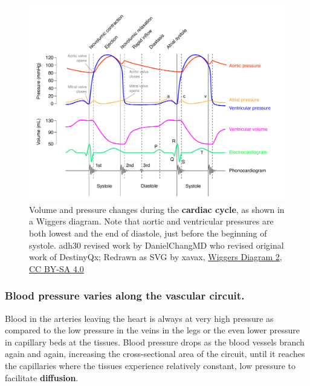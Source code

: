 \documentclass[
  letterpaper,
  DIV=11,
  numbers=noendperiod,
  oneside]{scrartcl}
\begin{document}
\begin{figure}

{\centering \includegraphics{Lab3_files/mediabag/../../images/Wiggers_Diagram_2.pdf}

}

\caption{\label{fig-wiggers}Volume and pressure changes during the
\textbf{cardiac cycle}, as shown in a Wiggers diagram. Note that aortic
and ventricular pressures are both lowest and the end of diastole, just
before the beginning of systole. adh30 revised work by DanielChangMD who
revised original work of DestinyQx; Redrawn as SVG by xavax,
\href{https://commons.wikimedia.org/wiki/File:Wiggers_Diagram_2.svg}{Wiggers
Diagram 2},
\href{https://creativecommons.org/licenses/by-sa/4.0/legalcode}{CC BY-SA
4.0}}

\end{figure}

\hypertarget{blood-pressure-varies-along-the-vascular-circuit.}{%
\subsubsection{Blood pressure varies along the vascular
circuit.}\label{blood-pressure-varies-along-the-vascular-circuit.}}

Blood in the arteries leaving the heart is always at very high pressure
as compared to the low pressure in the veins in the legs or the even
lower pressure in capillary beds at the tissues. Blood pressure drops as
the blood vessels branch again and again, increasing the cross-sectional
area of the circuit, until it reaches the capillaries where the tissues
experience relatively constant, low pressure to facilitate
\textbf{diffusion}.
\end{document}
